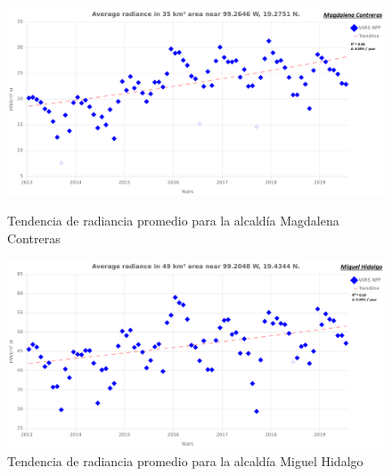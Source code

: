 \begin{figure}[H]
  \centering
    \includegraphics[width=1\textwidth]{MC}
  \caption{Tendencia de radiancia promedio para la alcaldía Magdalena Contreras}
  \label{radiancetrendsmc}
\vspace{20mm} 
    \includegraphics[width=1\textwidth]{MH}
  \caption{Tendencia de radiancia promedio para la alcaldía Miguel Hidalgo}
  \label{radiancetrendsmh}
\end{figure}
\blindtext

\

